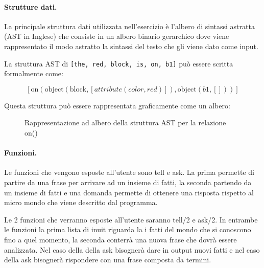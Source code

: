 \documentclass[12pt,twoside]{report}
\begin{document}
\paragraph{Strutture dati.} La principale struttura dati utilizzata nell'esercizio è l'albero di sintassi astratta (AST in Inglese) che consiste in un albero binario gerarchico dove viene rappresentato il modo astratto la sintassi del testo che gli viene dato come input.

La struttura AST di \texttt{[the, red, block, is, on, b1]} può essere scritta formalmente come:

\[
[\text{on}(\text{object}(\text{block},[attribute(color,red)]),\text{object}(b1,[]))]
\]

Questa struttura può essere rappresentata graficamente come un albero:

\begin{figure}[h]
\centering
{}
\caption{Rappresentazione ad albero della struttura AST per la relazione on()}
\label{fig:ast_structure}
\end{figure}


\paragraph{Funzioni.} Le funzioni che vengono esposte all'utente sono tell e ask. La prima permette di partire da una frase per arrivare ad un insieme di fatti, la seconda partendo da un insieme di fatti e una domanda permette di ottenere una risposta rispetto al micro mondo che viene descritto dal programma.

Le 2 funzioni che verranno esposte all'utente saranno tell/2 e ask/2. In entrambe le funzioni la prima lista di inuit riguarda la i fatti del mondo che si conoscono fino a quel momento, la seconda conterrà una nuova frase che dovrà essere analizzata. Nel caso della della ask bisognerà dare in output nuovi fatti e nel caso della ask bisognerà rispondere con una frase composta da termini.
\end{document}
